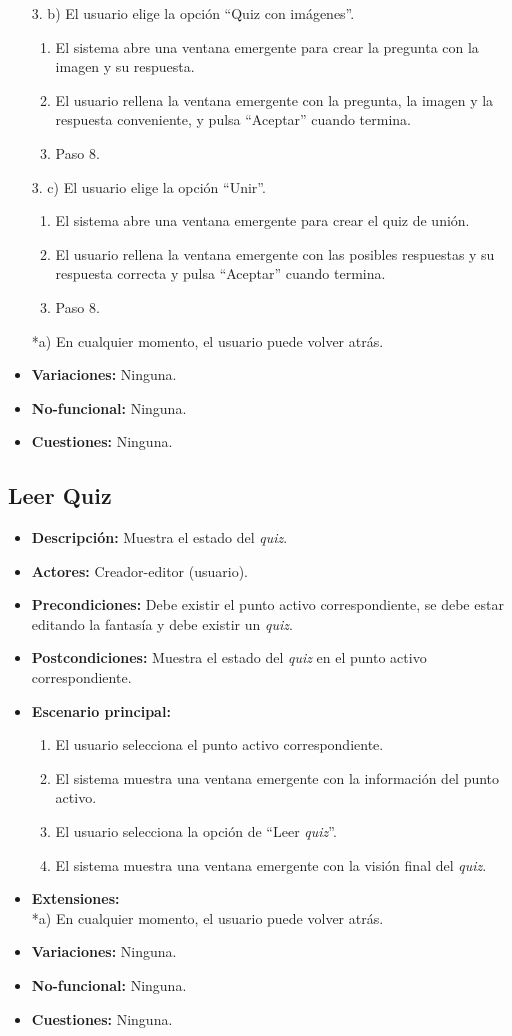 \documentclass[12pt,letterpaper]{article}
\begin{document}
\begin{itemize}
	3. b) El usuario elige la opción ``Quiz con imágenes''.
	\begin{enumerate}
		\item El sistema abre una ventana emergente para crear la pregunta con la imagen y su respuesta.
		\item El usuario rellena la ventana emergente con la pregunta, la imagen y la respuesta conveniente, y pulsa ``Aceptar'' cuando termina.
		\item Paso 8.
	\end{enumerate}
	3. c) El usuario elige la opción ``Unir''.
	\begin{enumerate}
		\item El sistema abre una ventana emergente para crear el quiz de unión.
		\item El usuario rellena la ventana emergente con las posibles respuestas y su respuesta correcta y pulsa ``Aceptar'' cuando termina.
		\item Paso 8.
	\end{enumerate}
	*a) En cualquier momento, el usuario puede volver atrás.
	\item \textbf{Variaciones:} Ninguna.
	\item \textbf{No-funcional:} Ninguna.
	\item \textbf{Cuestiones:} Ninguna.
\end{itemize}

\subsection{Leer Quiz}
\begin{itemize}
	\item \textbf{Descripción:} Muestra el estado del \textit{quiz}.
	\item \textbf{Actores:} Creador-editor (usuario).
	\item \textbf{Precondiciones:} Debe existir el punto activo correspondiente, se debe estar editando la fantasía y debe existir un \textit{quiz}.
	\item \textbf{Postcondiciones:} Muestra el estado del \textit{quiz} en el punto activo correspondiente.
	\item \textbf{Escenario principal:}
	\begin{enumerate}
		\item El usuario selecciona el punto activo correspondiente.
		\item El sistema muestra una ventana emergente con la información del punto activo.
		\item El usuario selecciona la opción de ``Leer \textit{quiz}''.
		\item El sistema muestra una ventana emergente con la visión final del \textit{quiz}.
	\end{enumerate}
	\item \textbf{Extensiones:} \\ *a) En cualquier momento, el usuario puede volver atrás.
	\item \textbf{Variaciones:} Ninguna.
	\item \textbf{No-funcional:} Ninguna.
	\item \textbf{Cuestiones:} Ninguna.
\end{itemize}
\end{document}
